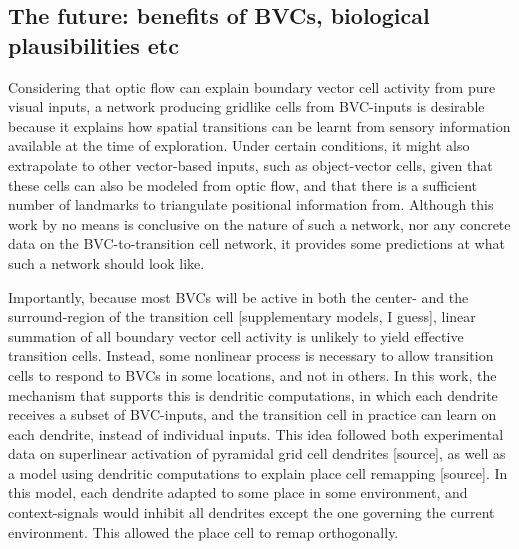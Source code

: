 \documentclass{article}
\begin{document}
    \subsection{The future: benefits of BVCs, biological plausibilities etc}

    Considering that optic flow can explain boundary vector cell activity from pure visual inputs, a network producing gridlike cells from BVC-inputs is desirable because it explains how spatial transitions can be learnt from sensory information available at the time of exploration. Under certain conditions, it might also extrapolate to other vector-based inputs, such as object-vector cells, given that these cells can also be modeled from optic flow, and that there is a sufficient number of landmarks to triangulate positional information from. Although this work by no means is conclusive on the nature of such a network, nor any concrete data on the BVC-to-transition cell network, it provides some predictions at what such a network should look like.

    Importantly, because most BVCs will be active in both the center- and the surround-region of the transition cell [supplementary models, I guess], linear summation of all boundary vector cell activity is unlikely to yield effective transition cells. Instead, some nonlinear process is necessary to allow transition cells to respond to BVCs in some locations, and not in others. In this work, the mechanism that supports this is dendritic computations, in which each dendrite receives a subset of BVC-inputs, and the transition cell in practice can learn on each dendrite, instead of individual inputs. This idea followed both experimental data on superlinear activation of pyramidal grid cell dendrites [source], as well as a model using dendritic computations to explain place cell remapping [source]. In this model, each dendrite adapted to some place in some environment, and context-signals would inhibit all dendrites except the one governing the current environment. This allowed the place cell to remap orthogonally.
\end{document}
